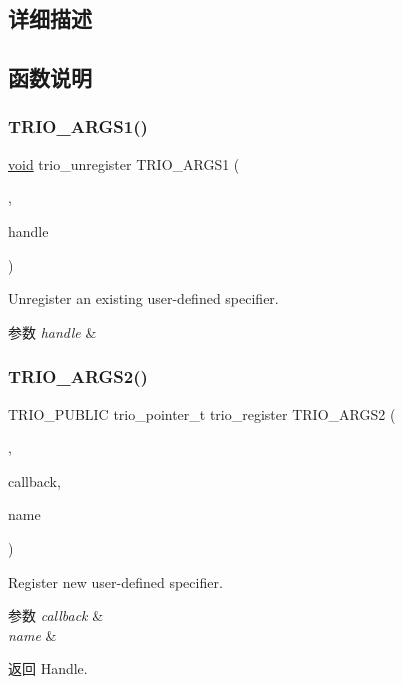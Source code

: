 \subsection{详细描述}


\subsection{函数说明}
\mbox{\label{group___user_defined_ga0c0c60dc963d34ebf42d3e82c603d175}} 
\subsubsection{\texorpdfstring{T\+R\+I\+O\+\_\+\+A\+R\+G\+S1()}{TRIO\_ARGS1()}}
{\footnotesize\ttfamily \hyperlink{interfacevoid}{void} trio\+\_\+unregister T\+R\+I\+O\+\_\+\+A\+R\+G\+S1 (\begin{DoxyParamCaption}\item[{(\hyperlink{structhandle}{handle})}]{,  }\item[{trio\+\_\+pointer\+\_\+t}]{handle }\end{DoxyParamCaption})}

Unregister an existing user-\/defined specifier.


\begin{DoxyParams}{参数}
{\em handle} & \\
\hline
\end{DoxyParams}
\mbox{\label{group___user_defined_gae8ec414d5e5232993dd888a92b5c9ced}} 
\subsubsection{\texorpdfstring{T\+R\+I\+O\+\_\+\+A\+R\+G\+S2()}{TRIO\_ARGS2()}}
{\footnotesize\ttfamily T\+R\+I\+O\+\_\+\+P\+U\+B\+L\+IC trio\+\_\+pointer\+\_\+t trio\+\_\+register T\+R\+I\+O\+\_\+\+A\+R\+G\+S2 (\begin{DoxyParamCaption}\item[{(callback, \hyperlink{structname}{name})}]{,  }\item[{trio\+\_\+callback\+\_\+t}]{callback,  }\item[{T\+R\+I\+O\+\_\+\+C\+O\+N\+ST char $\ast$}]{name }\end{DoxyParamCaption})}

Register new user-\/defined specifier.


\begin{DoxyParams}{参数}
{\em callback} & \\
\hline
{\em name} & \\
\hline
\end{DoxyParams}
\begin{DoxyReturn}{返回}
Handle. 
\end{DoxyReturn}
